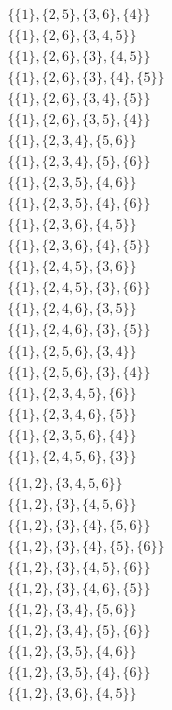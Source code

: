 \documentclass[11pt]{article}
\begin{document}
\begin{flushleft}
\begin{align*}
\{\{1\}, \{2, 5\}, \{3, 6\}, \{4\}\}\\
\{\{1\}, \{2, 6\}, \{3, 4, 5\}\}\\
\{\{1\}, \{2, 6\}, \{3\}, \{4, 5\}\}\\
\{\{1\}, \{2, 6\}, \{3\}, \{4\}, \{5\}\}\\
\{\{1\}, \{2, 6\}, \{3, 4\}, \{5\}\}\\
\{\{1\}, \{2, 6\}, \{3, 5\}, \{4\}\}\\
\{\{1\}, \{2, 3, 4\}, \{5, 6\}\}\\
\{\{1\}, \{2, 3, 4\}, \{5\}, \{6\}\}\\
\{\{1\}, \{2, 3, 5\}, \{4, 6\}\}\\
\{\{1\}, \{2, 3, 5\}, \{4\}, \{6\}\}\\
\{\{1\}, \{2, 3, 6\}, \{4, 5\}\}\\
\{\{1\}, \{2, 3, 6\}, \{4\}, \{5\}\}\\
\{\{1\}, \{2, 4, 5\}, \{3, 6\}\}\\
\{\{1\}, \{2, 4, 5\}, \{3\}, \{6\}\}\\
\{\{1\}, \{2, 4, 6\}, \{3, 5\}\}\\
\{\{1\}, \{2, 4, 6\}, \{3\}, \{5\}\}\\
\{\{1\}, \{2, 5, 6\}, \{3, 4\}\}\\
\{\{1\}, \{2, 5, 6\}, \{3\}, \{4\}\}\\
\{\{1\}, \{2, 3, 4, 5\}, \{6\}\}\\
\{\{1\}, \{2, 3, 4, 6\}, \{5\}\}\\
\{\{1\}, \{2, 3, 5, 6\}, \{4\}\}\\
\{\{1\}, \{2, 4, 5, 6\}, \{3\}\}\\
\end{align*}
\begin{align*}
\{\{1, 2\}, \{3, 4, 5, 6\}\}\\
\{\{1, 2\}, \{3\}, \{4, 5, 6\}\}\\
\{\{1, 2\}, \{3\}, \{4\}, \{5, 6\}\}\\
\{\{1, 2\}, \{3\}, \{4\}, \{5\}, \{6\}\}\\
\{\{1, 2\}, \{3\}, \{4, 5\}, \{6\}\}\\
\{\{1, 2\}, \{3\}, \{4, 6\}, \{5\}\}\\
\{\{1, 2\}, \{3, 4\}, \{5, 6\}\}\\
\{\{1, 2\}, \{3, 4\}, \{5\}, \{6\}\}\\
\{\{1, 2\}, \{3, 5\}, \{4, 6\}\}\\
\{\{1, 2\}, \{3, 5\}, \{4\}, \{6\}\}\\
\{\{1, 2\}, \{3, 6\}, \{4, 5\}\}\\

\end{align*}
\end{flushleft}
\end{document}
